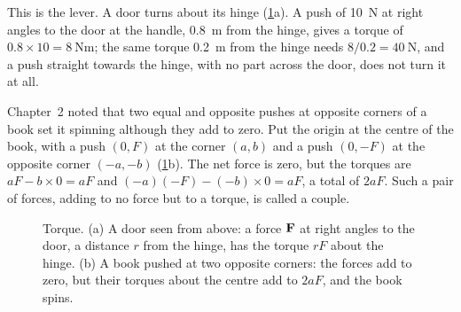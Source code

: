 This is the lever. A door turns about its hinge (\cref{fig:ro-lever}a). A
push of \SI{10}{\newton} at right angles to the door at the handle,
\SI{0.8}{\metre} from the hinge, gives a torque of $0.8\times10 =
\SI{8}{\newton\metre}$; the same torque \SI{0.2}{\metre} from the hinge
needs $8/0.2 = \SI{40}{\newton}$, and a push straight towards the hinge,
with no part across the door, does not turn it at all.

Chapter~2 noted that two equal and opposite pushes at opposite corners of
a book set it spinning although they add to zero. Put the origin at the
centre of the book, with a push $(0, F)$ at the corner $(a, b)$ and a push
$(0, -F)$ at the opposite corner $(-a, -b)$ (\cref{fig:ro-lever}b). The
net force is zero, but the torques are $aF - b\times0 = aF$ and $(-a)(-F)
- (-b)\times0 = aF$, a total of $2aF$. Such a pair of forces, adding to no
force but to a torque, is called a couple.

\begin{figure}[htb]
\centering
{}
\caption{Torque. (a) A door seen from above: a force $\bm{\mathrm{F}}$ at right
angles to the door, a distance $r$ from the hinge, has the torque $rF$
about the hinge. (b) A book pushed at two opposite corners: the forces add
to zero, but their torques about the centre add to $2aF$, and the book
spins.}
\label{fig:ro-lever}
\end{figure}

